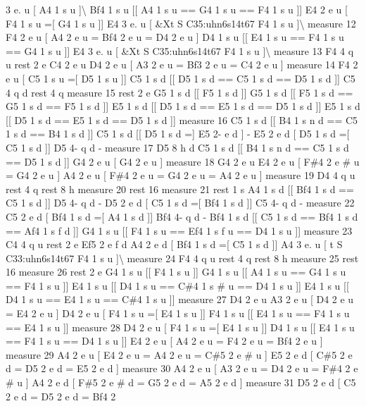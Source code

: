 3 e. u \mbox{[} A4 1 s u \mbox{]}\textbackslash{} Bf4 1 s u \mbox{[}\mbox{[} A4 1 s u == G4 1 s u == F4 1 s u \mbox{]}\mbox{]} E4 2 e u \mbox{[} F4 1 s u =\mbox{[} G4 1 s u \mbox{]}\mbox{]} E4 3 e. u \mbox{[} \&Xt S C35\+:uhn6s14t67 F4 1 s u \mbox{]}\textbackslash{} measure 12 F4 2 e u \mbox{[} A4 2 e u = Bf4 2 e u = D4 2 e u \mbox{]} D4 1 s u \mbox{[}\mbox{[} E4 1 s u == F4 1 s u == G4 1 s u \mbox{]}\mbox{]} E4 3 e. u \mbox{[} \&Xt S C35\+:uhn6s14t67 F4 1 s u \mbox{]}\textbackslash{} measure 13 F4 4 q u rest 2 e C4 2 e u D4 2 e u \mbox{[} A3 2 e u = Bf3 2 e u = C4 2 e u \mbox{]} measure 14 F4 2 e u \mbox{[} C5 1 s u =\mbox{[} D5 1 s u \mbox{]}\mbox{]} C5 1 s d \mbox{[}\mbox{[} D5 1 s d == C5 1 s d == D5 1 s d \mbox{]}\mbox{]} C5 4 q d rest 4 q measure 15 rest 2 e G5 1 s d \mbox{[}\mbox{[} F5 1 s d \mbox{]}\mbox{]} G5 1 s d \mbox{[}\mbox{[} F5 1 s d == G5 1 s d == F5 1 s d \mbox{]}\mbox{]} E5 1 s d \mbox{[}\mbox{[} D5 1 s d == E5 1 s d == D5 1 s d \mbox{]}\mbox{]} E5 1 s d \mbox{[}\mbox{[} D5 1 s d == E5 1 s d == D5 1 s d \mbox{]}\mbox{]} measure 16 C5 1 s d \mbox{[}\mbox{[} B4 1 s n d == C5 1 s d == B4 1 s d \mbox{]}\mbox{]} C5 1 s d \mbox{[}\mbox{[} D5 1 s d =\mbox{]} E5 2-\/ e d \mbox{]} -\/ E5 2 e d \mbox{[} D5 1 s d =\mbox{[} C5 1 s d \mbox{]}\mbox{]} D5 4-\/ q d -\/ measure 17 D5 8 h d C5 1 s d \mbox{[}\mbox{[} B4 1 s n d == C5 1 s d == D5 1 s d \mbox{]}\mbox{]} G4 2 e u \mbox{[} G4 2 e u \mbox{]} measure 18 G4 2 e u E4 2 e u \mbox{[} F\#4 2 e \# u = G4 2 e u \mbox{]} A4 2 e u \mbox{[} F\#4 2 e u = G4 2 e u = A4 2 e u \mbox{]} measure 19 D4 4 q u rest 4 q rest 8 h measure 20 rest 16 measure 21 rest 1 s A4 1 s d \mbox{[}\mbox{[} Bf4 1 s d == C5 1 s d \mbox{]}\mbox{]} D5 4-\/ q d -\/ D5 2 e d \mbox{[} C5 1 s d =\mbox{[} Bf4 1 s d \mbox{]}\mbox{]} C5 4-\/ q d -\/ measure 22 C5 2 e d \mbox{[} Bf4 1 s d =\mbox{[} A4 1 s d \mbox{]}\mbox{]} Bf4 4-\/ q d -\/ Bf4 1 s d \mbox{[}\mbox{[} C5 1 s d == Bf4 1 s d == Af4 1 s f d \mbox{]}\mbox{]} G4 1 s u \mbox{[}\mbox{[} F4 1 s u == Ef4 1 s f u == D4 1 s u \mbox{]}\mbox{]} measure 23 C4 4 q u rest 2 e Ef5 2 e f d A4 2 e d \mbox{[} Bf4 1 s d =\mbox{[} C5 1 s d \mbox{]}\mbox{]} A4 3 e. u \mbox{[} t S C33\+:uhn6s14t67 F4 1 s u \mbox{]}\textbackslash{} measure 24 F4 4 q u rest 4 q rest 8 h measure 25 rest 16 measure 26 rest 2 e G4 1 s u \mbox{[}\mbox{[} F4 1 s u \mbox{]}\mbox{]} G4 1 s u \mbox{[}\mbox{[} A4 1 s u == G4 1 s u == F4 1 s u \mbox{]}\mbox{]} E4 1 s u \mbox{[}\mbox{[} D4 1 s u == C\#4 1 s \# u == D4 1 s u \mbox{]}\mbox{]} E4 1 s u \mbox{[}\mbox{[} D4 1 s u == E4 1 s u == C\#4 1 s u \mbox{]}\mbox{]} measure 27 D4 2 e u A3 2 e u \mbox{[} D4 2 e u = E4 2 e u \mbox{]} D4 2 e u \mbox{[} F4 1 s u =\mbox{[} E4 1 s u \mbox{]}\mbox{]} F4 1 s u \mbox{[}\mbox{[} E4 1 s u == F4 1 s u == E4 1 s u \mbox{]}\mbox{]} measure 28 D4 2 e u \mbox{[} F4 1 s u =\mbox{[} E4 1 s u \mbox{]}\mbox{]} D4 1 s u \mbox{[}\mbox{[} E4 1 s u == F4 1 s u == D4 1 s u \mbox{]}\mbox{]} E4 2 e u \mbox{[} A4 2 e u = F4 2 e u = Bf4 2 e u \mbox{]} measure 29 A4 2 e u \mbox{[} E4 2 e u = A4 2 e u = C\#5 2 e \# u \mbox{]} E5 2 e d \mbox{[} C\#5 2 e d = D5 2 e d = E5 2 e d \mbox{]} measure 30 A4 2 e u \mbox{[} A3 2 e u = D4 2 e u = F\#4 2 e \# u \mbox{]} A4 2 e d \mbox{[} F\#5 2 e \# d = G5 2 e d = A5 2 e d \mbox{]} measure 31 D5 2 e d \mbox{[} C5 2 e d = D5 2 e d = Bf4 2 